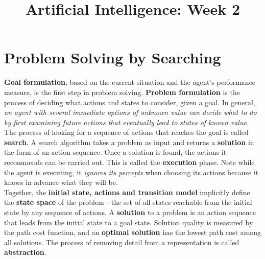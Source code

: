 \documentclass[twoside]{article}
\title{Artificial Intelligence: Week 2}
\date{}
\author{}
\begin{document}
\maketitle
\section{Problem Solving by Searching}

\textbf{Goal formulation}, based on the current situation and the agent's
performance measure, is the first step in problem solving. \textbf{Problem 
formulation} is the process of deciding what actions and states to consider,
given a goal. In general, \emph{an agent with several immediate options of 
unknown value can decide what to do by first examining future actions that 
eventually lead to states of known value.} The process of looking for a 
sequence of actions that reaches the goal is called \textbf{search}. A search
algorithm takes a problem as input and returns a \textbf{solution} in the 
form of an action sequence. Once a solution is found, the actions it recommends
can be carried out. This is called the \textbf{execution} phase. Note while
the agent is executing, it \emph{ignores its percepts} when choosing its actions
because it knows in advance what they will be.\\

Together, the \textbf{initial state, actions and transition model} implicitly
define the \textbf{state space} of the problem - the set of all states
reachable from the initial state by any sequence of actions. A \textbf{solution}
to a problem is an action sequence that leads from the initial state to a goal
state. Solution quality is measured by the path cost function, and an \textbf{
optimal solution} has the lowest path cost among all solutions. The process 
of removing detail from a representation is called \textbf{abstraction}.\\
\end{document}
